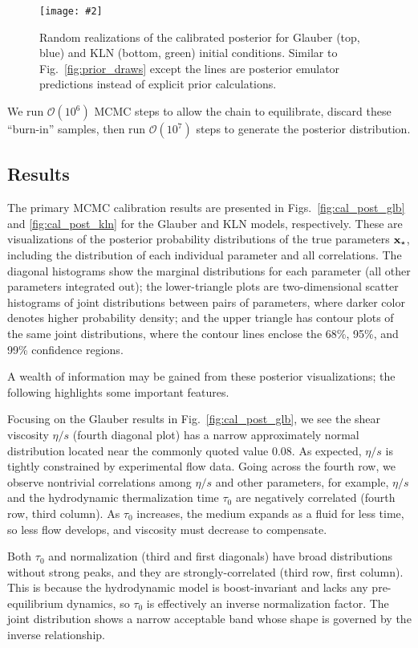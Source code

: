 \documentclass[aps,prc,reprint,superscriptaddress,amsmath]{revtex4-1}
\newcommand{\widefig}[3][t]{
  \begin{figure*}[#1]
    \texttt{[image: \#2]}
    \caption{\label{fig:#2}#3}
  \end{figure*}
}
\newcommand{\order}[1]{$\mathcal O(10^{#1})$}
\begin{document}
\widefig{post_draws}{
  Random realizations of the calibrated posterior for Glauber (top, blue) and KLN (bottom, green) initial conditions.
  Similar to Fig.~\ref{fig:prior_draws} except the lines are posterior emulator predictions instead of explicit prior calculations.
}

We run \order 6 MCMC steps to allow the chain to equilibrate, discard these ``burn-in'' samples, then run \order 7 steps to generate the posterior distribution.

\subsection{\label{sec:results}Results}

The primary MCMC calibration results are presented in Figs.~\ref{fig:cal_post_glb} and \ref{fig:cal_post_kln} for the Glauber and KLN models, respectively.
These are visualizations of the posterior probability distributions of the true parameters $\mathbf x_\star$, including the distribution of each individual parameter and all correlations.
The diagonal histograms show the marginal distributions for each parameter (all other parameters integrated out);
the lower-triangle plots are two-dimensional scatter histograms of joint distributions between pairs of parameters, where darker color denotes higher probability density;
and the upper triangle has contour plots of the same joint distributions, where the contour lines enclose the 68\%, 95\%, and 99\% confidence regions.

A wealth of information may be gained from these posterior visualizations; the following highlights some important features.

Focusing on the Glauber results in Fig.~\ref{fig:cal_post_glb}, we see the shear viscosity $\eta/s$ (fourth diagonal plot) has a narrow approximately normal distribution located near the commonly quoted value 0.08.
As expected, $\eta/s$ is tightly constrained by experimental flow data.
Going across the fourth row, we observe nontrivial correlations among $\eta/s$ and other parameters, for example, $\eta/s$ and the hydrodynamic thermalization time $\tau_0$ are negatively correlated (fourth row, third column).
As $\tau_0$ increases, the medium expands as a fluid for less time, so less flow develops, and viscosity must decrease to compensate.

Both $\tau_0$ and normalization (third and first diagonals) have broad distributions without strong peaks, and they are strongly-correlated (third row, first column).
This is because the hydrodynamic model is boost-invariant and lacks any pre-equilibrium dynamics, so $\tau_0$ is effectively an inverse normalization factor.
The joint distribution shows a narrow acceptable band whose shape is governed by the inverse relationship.
\end{document}
